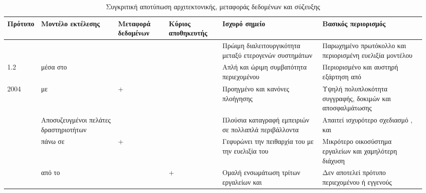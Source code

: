 \begin{table}[H]
\centering
\caption{Συγκριτική αποτύπωση αρχιτεκτονικής, μεταφοράς δεδομένων και σύζευξης}
\label{tab:architecture_comparison}
\small
\setlength{\tabcolsep}{5pt}
\renewcommand{\arraystretch}{1.25}
\begin{chaptertablebox}
\begin{tabularx}{\textwidth}{|p{1.8cm}|Y|Y|Y|Y|Y|}
\hline
\textbf{Πρότυπο} & \textbf{Μοντέλο εκτέλεσης} & \textbf{Μεταφορά δεδομένων} & \textbf{Κύριος αποθηκευτής} & \textbf{Ισχυρό σημείο} & \textbf{Βασικός περιορισμός} \\
\hline
{} &  &   &  & Πρώιμη διαλειτουργικότητα μεταξύ ετερογενών συστημάτων & Παρωχημένο πρωτόκολλο και περιορισμένη ευελιξία μοντέλου \\
\hline
{} 1.2 &  μέσα στο  &  &  & Απλή και ώριμη συμβατότητα περιεχομένου & Περιορισμένο  και αυστηρή εξάρτηση από  \\
\hline
{} 2004 &  με  &  +  &  & Προηγμένο  και κανόνες πλοήγησης & Υψηλή πολυπλοκότητα συγγραφής, δοκιμών και αποσφαλμάτωσης \\
\hline
{} & Αποσυζευγμένοι πελάτες δραστηριοτήτων &  &  & Πλούσια καταγραφή εμπειριών σε πολλαπλά περιβάλλοντα & Απαιτεί ισχυρότερο σχεδιασμό ,  και  \\
\hline
{} &  πάνω σε  &  +  &  & Γεφυρώνει την πειθαρχία του  με την ευελιξία του  & Μικρότερο οικοσύστημα εργαλείων και χαμηλότερη διάχυση \\
\hline
{} &  από το  &  &  +  & Ομαλή ενσωμάτωση τρίτων εργαλείων και  & Δεν αποτελεί πρότυπο περιεχομένου ή εγγενούς  \\
\hline
\end{tabularx}
\end{chaptertablebox}
\end{table}
